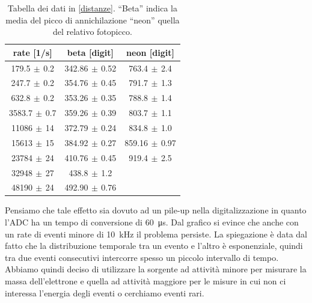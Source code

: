 \begin{table}[h]
\centering
\begin{tabular}{c|c|c}
rate [1/s] & beta [digit] & neon [digit] \\
\hline
 179.5$\,\pm\,$0.2 & 342.86$\,\pm\,$0.52 & 763.4$\,\pm\,$2.4 \\
 247.7$\,\pm\,$0.2 & 354.76$\,\pm\,$0.45 & 791.7$\,\pm\,$1.3 \\
 632.8$\,\pm\,$0.2 & 353.26$\,\pm\,$0.35 & 788.8$\,\pm\,$1.4 \\
3583.7$\,\pm\,$0.7 & 359.26$\,\pm\,$0.39 & 803.7$\,\pm\,$1.1 \\
  11086$\,\pm\,$14 & 372.79$\,\pm\,$0.24 & 834.8$\,\pm\,$1.0 \\
  15613$\,\pm\,$15 & 384.92$\,\pm\,$0.27 & 859.16$\,\pm\,$0.97 \\
  23784$\,\pm\,$24 & 410.76$\,\pm\,$0.45 & 919.4$\,\pm\,$2.5 \\
  32948$\,\pm\,$27 & 438.8$\,\pm\,$1.2 &         \\
  48190$\,\pm\,$24 & 492.90$\,\pm\,$0.76 &        
\end{tabular}

\caption{Tabella dei dati in \autoref{distanze}. ``Beta'' indica la media del picco di annichilazione ``neon'' quella del relativo fotopicco.}
\label{tabella forte}
\end{table}

Pensiamo che tale effetto sia dovuto ad un pile-up nella digitalizzazione in quanto l'ADC ha un tempo di conversione di \SI{60}{\micro s}. Dal grafico si evince che anche con un rate di eventi minore di \SI{10}{kHz} il problema persiste. La spiegazione è data dal fatto che la distribuzione temporale tra un evento e l'altro è esponenziale, quindi tra due eventi consecutivi intercorre spesso un piccolo intervallo di tempo. 
Abbiamo quindi deciso di utilizzare la sorgente ad attività minore per misurare la massa dell'elettrone e quella ad attività maggiore per le misure in cui non ci interessa l'energia degli eventi o cerchiamo eventi rari.

